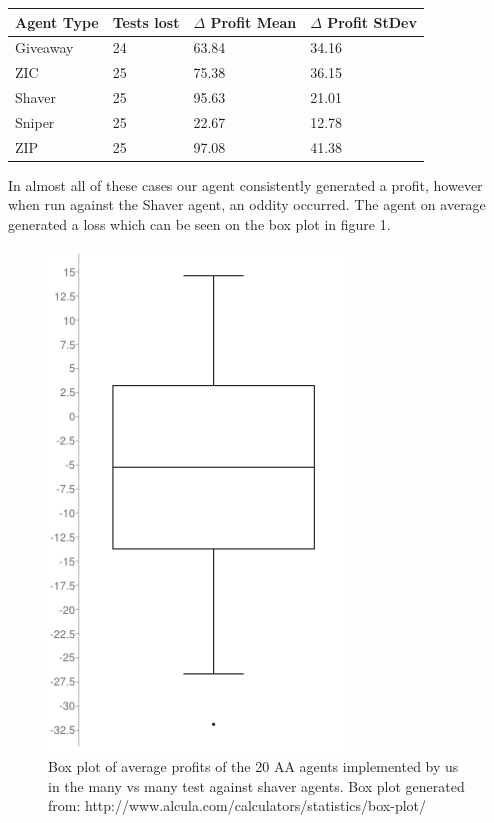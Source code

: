 \documentclass{acm_proc_article-sp}
\begin{document}
\begin{center}
  \begin{tabular}{ l | l | l | l }
        Agent Type & Tests lost & $\Delta$ Profit Mean & $\Delta$ Profit StDev \\\hline
        Giveaway & 24 & 63.84 & 34.16\\
        ZIC & 25 & 75.38 & 36.15\\
        Shaver & 25 & 95.63 & 21.01\\
        Sniper & 25 & 22.67 & 12.78\\
        ZIP & 25 & 97.08 & 41.38\\
  \end{tabular}
\end{center}

In almost all of these cases our agent consistently generated a profit,
however when run against the Shaver agent, an oddity occurred. The agent on
average generated a loss which can be seen on the box plot in figure 1.

\begin{figure}[h!] 
\includegraphics[width=80mm]{box-plot-image.png}

\caption{Box plot of average profits of the 20 AA agents implemented by us in
the many vs many test against shaver agents. Box plot generated from:
http://www.alcula.com/calculators/statistics/box-plot/}
\end{figure}
\end{document}

